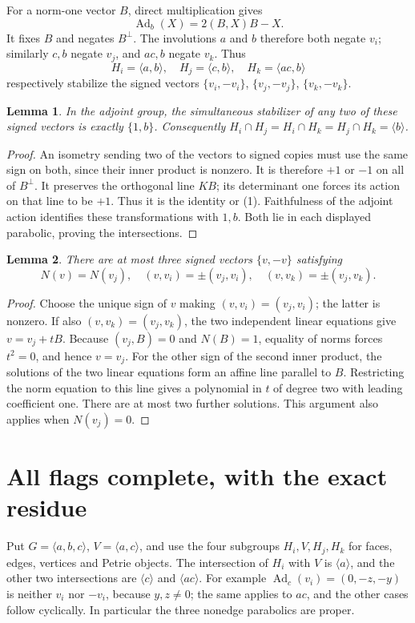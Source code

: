 \documentclass[11pt,a4paper]{article}
\newtheorem{lemma}{Lemma}\newtheorem{theorem}[lemma]{Theorem}
\newcommand{\gen}[1]{\langle#1\rangle}
\newcommand{\Ad}{\operatorname{Ad}}
\begin{document}
For a norm-one vector $B$, direct multiplication gives
\[
                  \Ad_b(X)=2(B,X)B-X.                 \tag{1}
\]
It fixes $B$ and negates $B^\perp$. The involutions $a$ and $b$
therefore both negate $v_i$; similarly $c,b$ negate $v_j$, and
$ac,b$ negate $v_k$. Thus
\[
 H_i=\gen{a,b},\quad H_j=\gen{c,b},\quad H_k=\gen{ac,b}
\]
respectively stabilize the signed vectors $\{v_i,-v_i\}$,
$\{v_j,-v_j\}$, $\{v_k,-v_k\}$.

\begin{lemma}\label{stabilizer}
In the adjoint group, the simultaneous stabilizer of any two of
these signed vectors is exactly $\{1,b\}$. Consequently
$H_i\cap H_j=H_i\cap H_k=H_j\cap H_k=\gen b$.
\end{lemma}
\begin{proof}
An isometry sending two of the vectors to signed copies must use
the same sign on both, since their inner product is nonzero. It is
therefore $+1$ or $-1$ on all of $B^\perp$. It preserves the
orthogonal line $KB$; its determinant one forces its action on that
line to be $+1$. Thus it is the identity or (1). Faithfulness of the
adjoint action identifies these transformations with $1,b$.
Both lie in each displayed parabolic, proving the intersections.
\end{proof}

\begin{lemma}\label{three}
There are at most three signed vectors $\{v,-v\}$ satisfying
\[
 N(v)=N(v_j),\quad (v,v_i)=\pm(v_j,v_i),\quad
 (v,v_k)=\pm(v_j,v_k).
\]
\end{lemma}
\begin{proof}
Choose the unique sign of $v$ making $(v,v_i)=(v_j,v_i)$;
the latter is nonzero. If also $(v,v_k)=(v_j,v_k)$, the two
independent linear equations give $v=v_j+tB$. Because
$(v_j,B)=0$ and $N(B)=1$, equality of norms forces $t^2=0$,
and hence $v=v_j$. For the other sign of the second inner product,
the solutions of the two linear equations form an affine line
parallel to $B$. Restricting the norm equation to this line gives
a polynomial in $t$ of degree two with leading coefficient one.
There are at most two further solutions. This argument also applies
when $N(v_j)=0$.
\end{proof}

\section{All flags complete, with the exact residue}
Put $G=\gen{a,b,c}$, $V=\gen{a,c}$, and use the four subgroups
$H_i,V,H_j,H_k$ for faces, edges, vertices and Petrie objects.
The intersection of $H_i$ with $V$ is $\gen a$, and the other
two intersections are $\gen c$ and $\gen{ac}$. For example
$\Ad_c(v_i)=(0,-z,-y)$ is neither $v_i$ nor $-v_i$, because
$y,z\ne0$; the same applies to $ac$, and the other cases follow
cyclically. In particular the three nonedge parabolics are proper.
\end{document}
